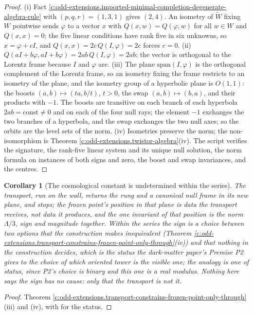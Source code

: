 \documentclass[11pt]{article}
\newtheorem{corollary}[theorem]{Corollary}
\theoremstyle{definition}
\theoremstyle{plain}
\begin{document}
\begin{proof}
(i) Fact \ref{c:odd-extensions.imported-minimal-completion-degenerate-algebra-rule} with $(p,q,r) = (1,3,1)$ gives $(2,4)$. An isometry of $\widetilde W$ fixing $W$ pointwise sends $\varphi$ to a vector $x$ with $Q(x, w) = Q(\varphi, w)$ for all $w \in W$ and $Q(x,x) = 0$; the five linear conditions have rank five in six unknowns, so $x = \varphi + cI$, and $Q(x,x) = 2c\,Q(I,\varphi) = 2c$ forces $c = 0$. (ii) $Q(aI + b\varphi, aI + b\varphi) = 2ab\,Q(I,\varphi) = 2ab$; the vector is orthogonal to the Lorentz frame because $I$ and $\varphi$ are. (iii) The plane $\mathrm{span}(I,\varphi)$ is the orthogonal complement of the Lorentz frame, so an isometry fixing the frame restricts to an isometry of the plane, and the isometry group of a hyperbolic plane is $O(1,1)$: the boosts $(a,b) \mapsto (ta, b/t)$, $t > 0$, the swap $(a,b) \mapsto (b,a)$, and their products with $-1$. The boosts are transitive on each branch of each hyperbola $2ab = \text{const} \neq 0$ and on each of the four null rays; the element $-1$ exchanges the two branches of a hyperbola, and the swap exchanges the two null axes; so the orbits are the level sets of the norm. (iv) Isometries preserve the norm; the non-isomorphism is Theorem \ref{c:odd-extensions.twistor-algebra}(iv). The script verifies the signature, the rank-five linear system and its unique null solution, the norm formula on instances of both signs and zero, the boost and swap invariances, and the centres.

\end{proof}

\begin{corollary}[The cosmological constant is undetermined within the series]\label{c:odd-extensions.cosmological-constant-undetermined-within-series}
The transport, run on the wall, returns the rung and a canonical null frame in its new plane, and stops; the frozen point's position in that plane is data the transport receives, not data it produces, and the one invariant of that position is the norm $\Lambda/3$, sign and magnitude together. Within the series the sign is a choice between two options that the construction makes inequivalent (Theorem \ref{c:odd-extensions.transport-constrains-frozen-point-only-through}(iv)) and that nothing in the construction decides, which is the status the dark-matter paper's Premise P2 gives to the choice of which oriented tower is the visible one; the analogy is one of status, since P2's choice is binary and this one is a real modulus. Nothing here says the sign has no cause: only that the transport is not it.
\end{corollary}
\begin{proof}
Theorem \ref{c:odd-extensions.transport-constrains-frozen-point-only-through}(iii) and (iv), with \cite[Premise P2]{ButlerT14} for the status.

\end{proof}
\end{document}

